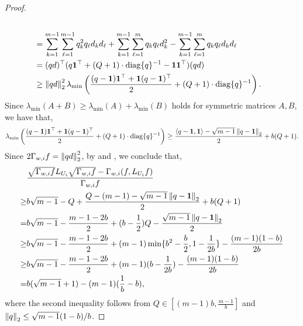 \begin{proof}
\begin{align}
        \\&=\sum_{k=1}^{m-1}\sum_{\ell=1}^{m-1}q_k^2q_\ell d_kd_\ell
        + \sum_{k=1}^{m-1}\sum_{\ell=1}^m q_kq_\ell d_k^2
        - \sum_{k=1}^{m-1}\sum_{\ell=1}^m q_kq_\ell d_k d_\ell \nonumber
        \\&= (qd)^\top (q\boldsymbol{1}^\top + (Q+1)\cdot \mathrm{diag}\{q\}^{-1} - \boldsymbol{1}\boldsymbol{1}^\top)  (qd) \nonumber
        \\&\geq \left\lVert qd \right\rVert_2^2 \lambda_{\min}\left(\frac{(q-\boldsymbol{1})\boldsymbol{1}^\top + \boldsymbol{1}(q-\boldsymbol{1})^\top}{2} + (Q+1)\cdot \mathrm{diag}\{q\}^{-1}\right) \label{eq:Local_curvature_part2} .
    \end{align}
    Since $\lambda_{\min}(A+B)\geq \lambda_{\min}(A)+\lambda_{\min}(B)$ holds for symmetric matrices $A,B$, we have that,
    $$
        \lambda_{\min}\left(\frac{(q-\boldsymbol{1})\boldsymbol{1}^\top + \boldsymbol{1}(q-\boldsymbol{1})^\top}{2} + (Q+1)\cdot \mathrm{diag}\{q\}^{-1}\right) \geq \frac{\left\langle q-\boldsymbol{1},\boldsymbol{1}\right\rangle-\sqrt{m-1}\left\lVert q-\boldsymbol{1} \right\rVert_2}{2} + b(Q+1) .
    $$
    Since $2\Gamma_{w,i} f = \left\lVert qd \right\rVert_2^2$, by  and , we conclude that,
    \begin{align*}
        &\frac{\sqrt{\Gamma_{w,i} f}L_{U_i}\sqrt{\Gamma_{w,i} f} - \Gamma_{w,i}(f,L_{U_i} f)}{\Gamma_{w,i} f}
        \\\geq& b\sqrt{m-1} - Q +  \frac{Q-(m-1)-\sqrt{m-1}\left\lVert q-\boldsymbol{1} \right\rVert_2}{2} + b(Q+1)
        \\=& b\sqrt{m-1} -\frac{m-1-2b}{2} + (b-\frac{1}{2})Q - \frac{\sqrt{m-1}\left\lVert q-\boldsymbol{1} \right\rVert_2}{2} 
        \\\geq& b\sqrt{m-1} -\frac{m-1-2b}{2} + (m-1)\min\{b^2-\frac{b}{2},1-\frac{1}{2b}\} - \frac{(m-1)(1-b)}{2b} 
        \\\geq& b\sqrt{m-1} -\frac{m-1-2b}{2} + (m-1)(b-\frac 1{2b}) - \frac{(m-1)(1-b)}{2b} 
        \\=& b(\sqrt{m-1}+1)-(m-1)(\frac 1b-b),
    \end{align*}
    where the second inequality follows from $Q \in [(m-1)b,\frac {m-1}b]$ and $\left\lVert q \right\rVert_2 \leq \sqrt{m-1}(1-b)/b$.
\end{proof}



